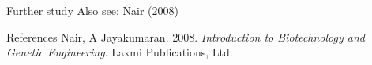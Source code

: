 \documentclass[
  ignorenonframetext,
  aspectratio=169]{beamer}
\newlength{\cslhangindent}
\newenvironment{cslreferences}%
  {\setlength{\parindent}{0pt}%
  \everypar{\setlength{\hangindent}{\cslhangindent}}\ignorespaces}%
  {\par}
\begin{document}
\begin{frame}{Further study}
\protect\hypertarget{further-study}{}
Also see: Nair (\protect\hyperlink{ref-nair2008introduction}{2008})
\end{frame}

\begin{frame}{References}
\protect\hypertarget{references}{}
\hypertarget{refs}{}
\begin{cslreferences}
\leavevmode\hypertarget{ref-nair2008introduction}{}%
Nair, A Jayakumaran. 2008. \emph{Introduction to Biotechnology and
Genetic Engineering}. Laxmi Publications, Ltd.
\end{cslreferences}
\end{frame}
\end{document}
